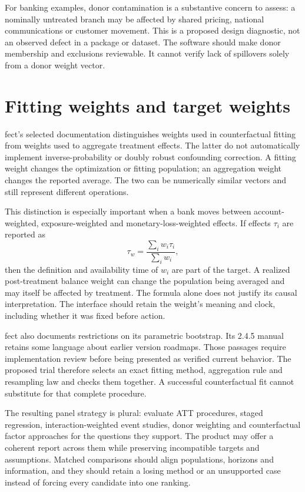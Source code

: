 For banking examples, donor contamination is a substantive concern to assess:
a nominally untreated branch may be affected by shared pricing, national
communications or customer movement. This is a proposed design diagnostic,
not an observed defect in a package or dataset. The software should make donor
membership and exclusions reviewable. It cannot verify lack of spillovers
solely from a donor weight vector.

\section{Fitting weights and target weights}

fect's selected documentation distinguishes weights used in counterfactual
fitting from weights used to aggregate treatment effects. The latter do not
automatically implement inverse-probability or doubly robust confounding
correction. A fitting weight changes the optimization or fitting population;
an aggregation weight changes the reported average. The two can be numerically
similar vectors and still represent different operations.\cite{fect}

This distinction is especially important when a bank moves between
account-weighted, exposure-weighted and monetary-loss-weighted effects.
If effects \(\tau_i\) are reported as
\[
 \tau_w=\frac{\sum_i w_i\tau_i}{\sum_i w_i},
\]
then the definition and availability time of \(w_i\) are part of the target.
A realized post-treatment balance weight can change the population being
averaged and may itself be affected by treatment. The formula alone does not
justify its causal interpretation. The interface should retain the weight's
meaning and clock, including whether it was fixed before action.

fect also documents restrictions on its parametric bootstrap. Its 2.4.5
manual retains some language about earlier version roadmaps. Those passages
require implementation review before being presented as verified current
behavior. The proposed trial therefore selects an exact fitting method,
aggregation rule and resampling law and checks them together. A successful
counterfactual fit cannot substitute for that complete procedure.

The resulting panel strategy is plural: evaluate ATT procedures, staged
regression, interaction-weighted event studies, donor weighting and
counterfactual factor approaches for the questions they support. The product
may offer a coherent report across them while preserving incompatible targets
and assumptions. Matched comparisons should align populations, horizons and
information, and they should retain a losing method or an unsupported case
instead of forcing every candidate into one ranking.

